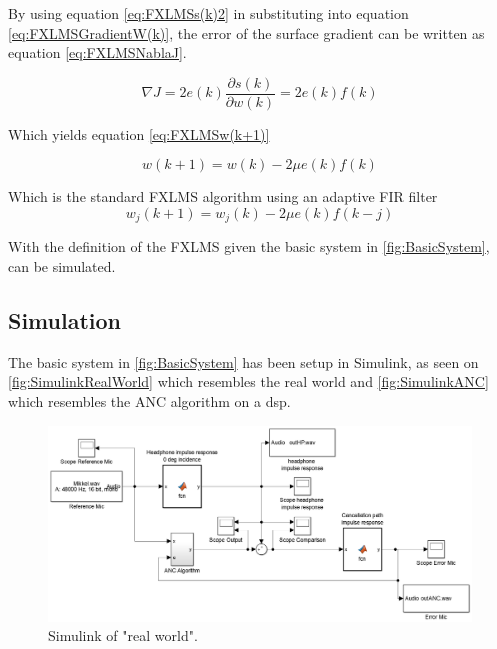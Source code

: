 By using equation \ref{eq:FXLMSs(k)2} in substituting into equation \ref{eq:FXLMSGradientW(k)}, the error of the surface gradient can be written as equation \ref{eq:FXLMSNablaJ}.

\begin{equation}\label{eq:FXLMSNablaJ}
\nabla J = 2e(k)\frac{\partial s(k)}{\partial w(k)} = 2e(k)f(k)
\end{equation}

Which yields equation \ref{eq:FXLMSw(k+1)}

\begin{equation}\label{eq:FXLMSw(k+1)}
w(k+1) = w(k) - 2\mu e(k)f(k)
\end{equation}

Which is the standard FXLMS algorithm using an adaptive FIR filter
\begin{equation}\label{eq:FXLMSw_j(k+1)}
w_j(k+1) = w_j(k) - 2\mu e(k)f(k-j)
\end{equation}

With the definition of the FXLMS given the basic system in \autoref{fig:BasicSystem}, can be simulated.







\subsection{Simulation} 
The basic system in \autoref{fig:BasicSystem} has been setup in Simulink, as seen on \autoref{fig:SimulinkRealWorld} which resembles the real world and \autoref{fig:SimulinkANC} which resembles the ANC algorithm on a dsp. 

\begin{figure}[H]
	\centering
	\includegraphics[width=1\textwidth]{figures/BasicSystem/SimulinkRealWorld}
	\caption{Simulink of "real world".}
	\label{fig:SimulinkRealWorld}
\end{figure}    

